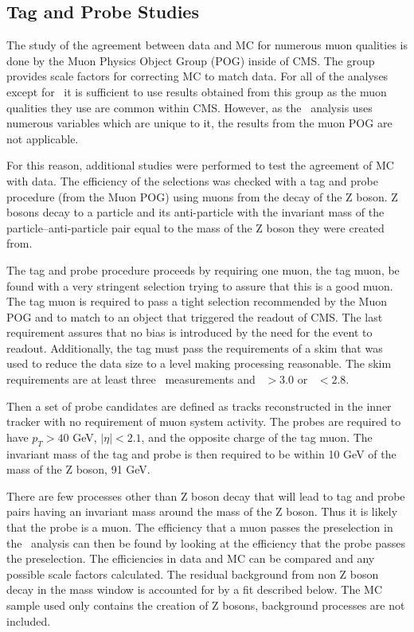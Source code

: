 \subsection{Tag and Probe Studies \label{sec:TagProbe}}
The study of the agreement between data and MC for numerous muon qualities is done by the Muon Physics Object Group (POG) inside of CMS.
The group provides scale factors for correcting MC to match data.
For all of the analyses except for \muononly\  it is sufficient to use results obtained from this group as the muon qualities
they use are common within CMS.
However, as the \muononly\ analysis uses numerous variables which are unique to it, the results from the muon POG are not applicable.

For this reason, additional studies were performed to test the agreement of MC with data.
The efficiency of the selections was checked with a tag and probe procedure
(from the Muon POG) using muons from the decay of the Z boson. Z bosons decay to a particle and its anti-particle with the invariant mass of the particle--anti-particle
pair equal to the mass of the Z boson they were created from.

The tag and probe procedure proceeds by
requiring one muon, the tag muon, be found with a very stringent selection trying to assure that this is a good muon. The tag muon is required to pass
a tight selection recommended by the Muon POG and to match to an object that triggered the readout of CMS. 
The last requirement assures that no bias is introduced by the need for the event to readout.
Additionally, the tag must pass the requirements of a skim that was used to reduce the data size to a level
making processing reasonable. The skim requirements are at least three \dedx\ measurements and \ih\ $> 3.0$ or \ih\ $< 2.8$.

Then a set of probe candidates are defined as tracks reconstructed in the inner tracker with no requirement
of muon system activity. The probes are required to have $p_T > 40$ GeV, $|\eta| < 2.1$, and the opposite charge of the tag muon. The invariant mass of the tag and
probe is then required to be within 10 GeV of the mass of the Z boson, 91 GeV.

There are few processes other than Z boson decay that will lead to tag and probe pairs having an invariant mass around the mass of the Z boson. Thus it is likely that the
probe is a muon. The efficiency that a muon passes the preselection in the \muononly\ analysis can then be found by looking at the efficiency that the probe
passes the preselection. The efficiencies in data and MC can be compared and any possible scale factors calculated. The residual background from non Z boson decay in the
mass window is accounted for by a fit described below. The MC sample used only contains the creation of Z bosons, background processes are not included.

